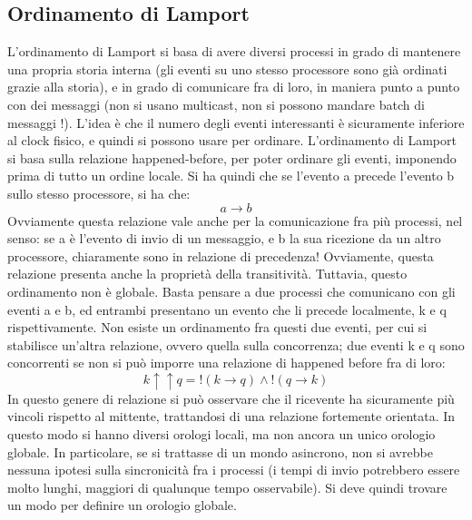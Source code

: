 \subsection{Ordinamento di Lamport}
L'ordinamento di Lamport si basa di avere diversi processi in grado di mantenere una propria storia interna (gli 
eventi su uno stesso processore sono già ordinati grazie alla storia), e in grado di comunicare fra di loro, in maniera
punto a punto con dei messaggi (non si usano multicast, non si possono mandare batch di messaggi !). L'idea è che il
numero degli eventi interessanti è sicuramente inferiore al clock fisico, e quindi si possono usare per ordinare.
L'ordinamento di Lamport si basa sulla relazione happened-before, per poter ordinare gli eventi, imponendo prima di
tutto un ordine locale. Si ha quindi che se l'evento a precede l'evento b sullo stesso processore, si ha che:
\begin{equation}
 a \rightarrow b 
\end{equation}
Ovviamente questa relazione vale anche per la comunicazione fra più processi, nel senso: se a è l'evento di invio di 
un messaggio, e b la sua ricezione da un altro processore, chiaramente sono in relazione di precedenza! Ovviamente,
questa relazione presenta anche la proprietà della transitività.
Tuttavia, questo ordinamento non è globale. Basta pensare a due processi che comunicano con gli eventi a e b, ed
entrambi presentano un evento che li precede localmente, k e q rispettivamente. Non esiste un ordinamento fra questi
due eventi, per cui si stabilisce un'altra relazione, ovvero quella sulla concorrenza; due eventi k e q sono
concorrenti se non si può imporre una relazione di happened before fra di loro:
\begin{equation}
 k \uparrow\uparrow q =!(k \rightarrow q)\land!(q \rightarrow k)
\end{equation}
In questo genere di relazione si può osservare che il ricevente ha sicuramente più vincoli rispetto al mittente,
trattandosi di una relazione fortemente orientata. In questo modo si hanno diversi orologi locali, ma non ancora un
unico orologio globale. In particolare, se si trattasse di un mondo asincrono, non si avrebbe nessuna ipotesi sulla
sincronicità fra i processi (i tempi di invio potrebbero essere molto lunghi, maggiori di qualunque tempo osservabile).
Si deve quindi trovare un modo per definire un orologio globale.

